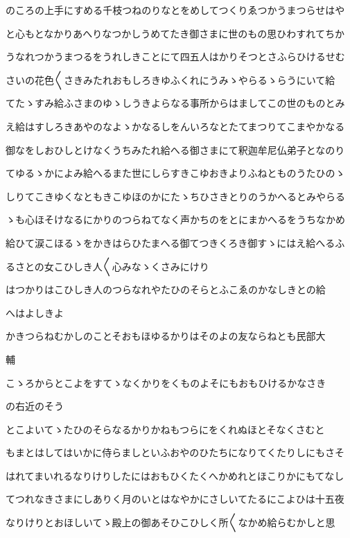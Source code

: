 \documentclass[a4paper,11pt,landscape]{ltjtarticle}
\begin{document}
のころの上手にすめる千枝つねのりなとをめしてつくりゑつかうまつらせはや
\par\medskip
と心もとなかりあへりなつかしうめてたき御さまに世のもの思ひわすれてちか
\par\medskip
うなれつかうまつるをうれしきことにて四五人はかりそつとさふらひけるせむ
\par\medskip
さいの花色〱さきみたれおもしろきゆふくれにうみゝやらるゝらうにいて給
\par\medskip
てたゝすみ給ふさまのゆゝしうきよらなる事所からはましてこの世のものとみ
\par\medskip
え給はすしろきあやのなよゝかなるしをんいろなとたてまつりてこまやかなる
\par\medskip
御なをしおひしとけなくうちみたれ給へる御さまにて釈迦牟尼仏弟子となのり
\par\medskip
てゆるゝかによみ給へるまた世にしらすきこゆおきよりふねとものうたひのゝ
\par\medskip
しりてこきゆくなともきこゆほのかにたゝちひさきとりのうかへるとみやらる
\par\medskip
ゝも心ほそけなるにかりのつらねてなく声かちのをとにまかへるをうちなかめ
\par\medskip
給ひて涙こほるゝをかきはらひたまへる御てつきくろき御すゝにはえ給へるふ
\par\medskip
るさとの女こひしき人〱心みなゝくさみにけり
\par\medskip
はつかりはこひしき人のつらなれやたひのそらとふこゑのかなしきとの給
\par\medskip
へはよしきよ
\par\medskip
かきつらねむかしのことそおもほゆるかりはそのよの友ならねとも民部大
\par\medskip
輔
\par\medskip
こゝろからとこよをすてゝなくかりをくものよそにもおもひけるかなさき
\par\medskip
の右近のそう
\par\medskip
とこよいてゝたひのそらなるかりかねもつらにをくれぬほとそなくさむと
\par\medskip
もまとはしてはいかに侍らましといふおやのひたちになりてくたりしにもさそ
\par\medskip
はれてまいれるなりけりしたにはおもひくたくへかめれとほこりかにもてなし
\par\medskip
てつれなきさまにしありく月のいとはなやかにさしいてたるにこよひは十五夜
\par\medskip
なりけりとおほしいてゝ殿上の御あそひこひしく所〱なかめ給らむかしと思
\par\medskip
\end{document}
